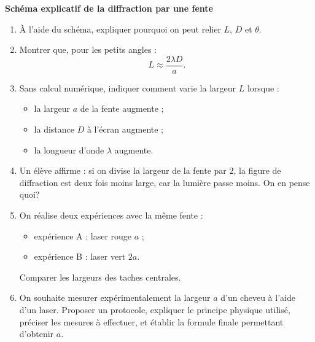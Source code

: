 \documentclass[11pt,a4paper]{article}
\begin{document}
\begin{schemabox}
\centering
\textbf{Schéma explicatif de la diffraction par une fente}\\[0.5em]
\end{schemabox}

\begin{enumerate}[label=\textbf{\arabic*.}]
    \item À l’aide du schéma, expliquer pourquoi on peut relier \(L\), \(D\) et \(\theta\).
    \item Montrer que, pour les petits angles :
    \[
    L \approx \frac{2\lambda D}{a}.
    \]
    \item Sans calcul numérique, indiquer comment varie la largeur \(L\) lorsque :
    \begin{itemize}
        \item la largeur \(a\) de la fente augmente ;
        \item la distance \(D\) à l’écran augmente ;
        \item la longueur d’onde \(\lambda\) augmente.
    \end{itemize}
    \item Un élève affirme : \og si on divise la largeur de la fente par \(2\), la figure de diffraction est deux fois moins large, car la lumière passe moins\fg.  
    On en pense quoi?
    \item On réalise deux expériences avec la même fente :
    \begin{itemize}
        \item expérience A : laser rouge \(a\) ;
        \item expérience B : laser vert \(2a\).
    \end{itemize}
    Comparer les largeurs des taches centrales.
    \item \textbf{}  
    On souhaite mesurer expérimentalement la largeur \(a\) d’un cheveu à l’aide d’un laser.  
    Proposer un protocole, expliquer le principe physique utilisé, préciser les mesures à effectuer, et établir la formule finale permettant d’obtenir \(a\).
\end{enumerate}
\end{document}
